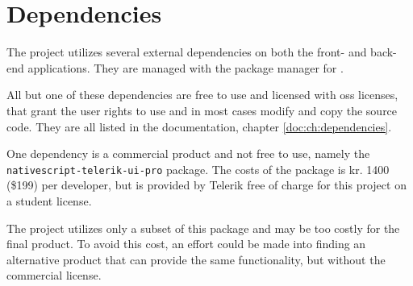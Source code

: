 \chapter{Dependencies}
\label{ch:dependencies}
The project utilizes several external dependencies on both the front- and back-end applications.
They are managed with the package manager  for .

All but one of these dependencies are free to use and licensed with \gls{oss} licenses, that grant the user rights to use and in most cases modify and copy the source code.
They are all listed in the documentation, chapter \ref{doc:ch:dependencies}.

One dependency is a commercial product and not free to use, namely the \verb+nativescript-telerik-ui-pro+ package.
The costs of the package is kr. 1400 (\$199) \citep{dependencies:nativescript} per developer, but is provided by Telerik free of charge for this project on a student license.

The project utilizes only a subset of this package and may be too costly for the final product.
To avoid this cost, an effort could be made into finding an alternative product that can provide the same functionality, but without the commercial license.
